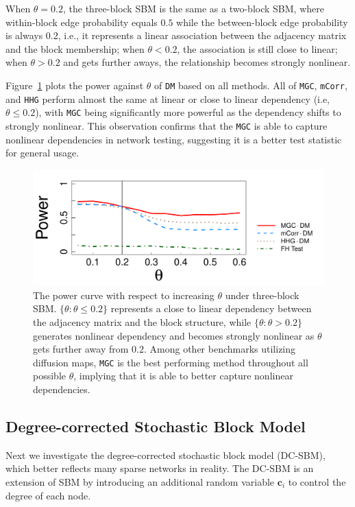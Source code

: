 \documentclass[11pt]{article}
\theoremstyle{definition}
\begin{document}
When $\theta = 0.2$, the three-block SBM is the same as a two-block SBM, where within-block edge probability equals $0.5$ while the between-block edge probability is always $0.2$, i.e., it represents a linear association between the adjacency matrix and the block membership; when $\theta<0.2$, the association is still close to linear; when $\theta > 0.2$ and gets further aways, the relationship becomes strongly nonlinear.

Figure~\ref{fig:powerplot} plots the power against $\theta$ of \texttt{DM} based on all methods. All of \texttt{MGC}, \texttt{mCorr}, and \texttt{HHG} perform almost the same at linear or close to linear dependency (i.e, $\theta \leq 0.2$), with \texttt{MGC} being significantly more powerful as the dependency shifts to strongly nonlinear. This observation confirms that the \texttt{MGC} is able to capture nonlinear dependencies in network testing, suggesting it is a better test statistic for general usage.

\begin{figure}[ht]
	\centering
	\includegraphics[width=0.7\linewidth]{../Figure/monoelbow3_t3.pdf}
	\caption{The power curve with respect to increasing $\theta$ under three-block SBM. $\{\theta : \theta \leq 0.2 \}$ represents a close to linear dependency between the adjacency matrix and the block structure, while $\{ \theta : \theta > 0.2 \}$ generates nonlinear dependency and becomes strongly nonlinear as $\theta$ gets further away from $0.2$. Among other benchmarks utilizing diffusion maps, \texttt{MGC} is the best performing method throughout all possible $\theta$, implying that it is able to better capture nonlinear dependencies.} 
	\label{fig:powerplot}
\end{figure}

\subsection{Degree-corrected Stochastic Block Model}
Next we investigate the degree-corrected stochastic block model (DC-SBM), which better reflects many sparse networks in reality. The DC-SBM is an extension of SBM by introducing an additional random variable $\mathbf{c}_{i}$ to control the degree of each node. 
\end{document}
